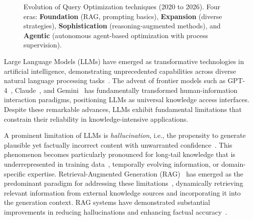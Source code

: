 \documentclass{article}
\begin{document}
{\begin{figure}[t]
{%
}
\caption{Evolution of Query Optimization techniques (2020 to 2026). Four eras: \textbf{Foundation} (RAG, prompting basics), \textbf{Expansion} (diverse strategies), \textbf{Sophistication} (reasoning-augmented methods), and \textbf{Agentic} (autonomous agent-based optimization with process supervision).}
\label{fig:timeline}
\end{figure}%
}

Large Language Models (LLMs) have emerged as transformative technologies in artificial intelligence, demonstrating unprecedented capabilities across diverse natural language processing tasks~\citep{llm_survey,DBLP:conf/nips/BrownMRSKDNSSAA20,DBLP:journals/corr/abs-2303-08774}. The advent of frontier models such as GPT-4~\citep{DBLP:journals/corr/abs-2303-08774}, Claude~\citep{claude3}, and Gemini~\citep{gemini} has fundamentally transformed human-information interaction paradigms, positioning LLMs as universal knowledge access interfaces. Despite these remarkable advances, LLMs exhibit fundamental limitations that constrain their reliability in knowledge-intensive applications.

A prominent limitation of LLMs is \textit{hallucination}, i.e., the propensity to generate plausible yet factually incorrect content with unwarranted confidence~\citep{hallucination1,hallucination2}. This phenomenon becomes particularly pronounced for long-tail knowledge that is underrepresented in training data~\citep{survey1}, temporally evolving information, or domain-specific expertise. Retrieval-Augmented Generation (RAG)~\citep{2020rag} has emerged as the predominant paradigm for addressing these limitations~\citep{survey2,survey8,survey11}, dynamically retrieving relevant information from external knowledge sources and incorporating it into the generation context. RAG systems have demonstrated substantial improvements in reducing hallucinations and enhancing factual accuracy~\citep{survey2,survey8}.
\end{document}
